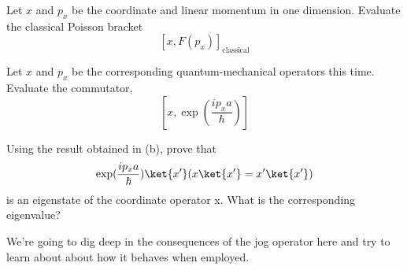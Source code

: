 \begin{question}

  \begin{questionpart}
    Let $x$ and $p_x$ be the coordinate and linear momentum in one
    dimension.  Evaluate the classical Poisson bracket
    \begin{equation*}
      \left[
        x,F(p_x)
        \right]_{\text{classical}}
    \end{equation*}
  \end{questionpart}

  \begin{questionpart}
    Let $x$ and $p_x$ be the corresponding quantum-mechanical
    operators this time.  Evaluate the commutator,
    \begin{equation*}
      \left[
        x,\exp(\frac{ip_xa}{\hbar})
        \right]
    \end{equation*}
  \end{questionpart}

  \begin{questionpart}
    Using the result obtained in (b), prove that
    \begin{equation*}
      \exp(\frac{ip_xa}{\hbar})\ket{x'} (x\ket{x'} = x'\ket{x'})
    \end{equation*}
    is an eigenstate of the coordinate operator x.  What is the
    corresponding eigenvalue?
  \end{questionpart}
\end{question}

\begin{purpose}
  We're going to dig deep in the consequences of the jog operator here
  and try to learn about about how it behaves when employed.
\end{purpose}


